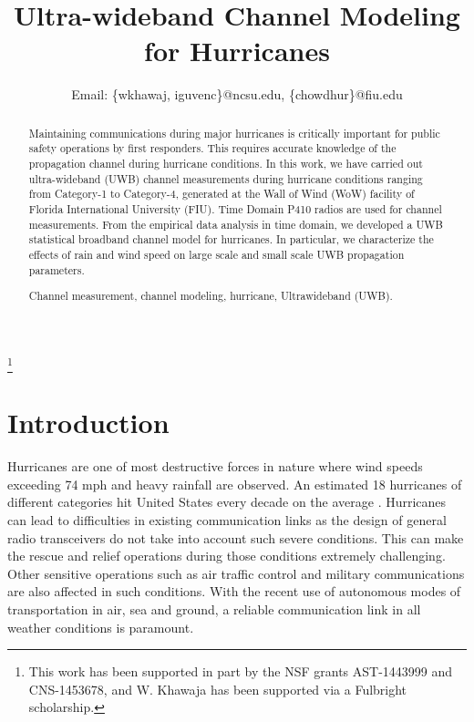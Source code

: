 \documentclass[conference]{IEEEtran}
\newcommand\blfootnote[1]{%
		\begingroup
		\renewcommand\thefootnote{}\footnote{#1}%
		\addtocounter{footnote}{-1}%
		\endgroup
	}
\begin{document}
	

\title{Ultra-wideband Channel Modeling for Hurricanes}

\author{
Email: \{wkhawaj, iguvenc\}@ncsu.edu, \{chowdhur\}@fiu.edu
	
}


\maketitle
\blfootnote{This work has been supported in part by the NSF grants AST-1443999 and CNS-1453678, and W. Khawaja has been supported via a Fulbright scholarship.}
\begin{abstract}
Maintaining communications during major hurricanes is critically important for public safety operations by first responders. This requires accurate knowledge of the propagation channel during hurricane conditions. In this work, we have carried out ultra-wideband (UWB) channel measurements during hurricane conditions ranging from Category-1 to Category-4, generated at the Wall of Wind (WoW) facility of Florida International University (FIU). Time Domain P410 radios are used for channel measurements. From the empirical data analysis in time domain, we developed a UWB statistical broadband channel model for hurricanes. In particular, we characterize the effects of rain and wind speed on large scale and small scale UWB propagation parameters. %

\begin{IEEEkeywords}
Channel measurement, channel modeling, hurricane, Ultrawideband (UWB).
\end{IEEEkeywords}

\end{abstract}

\IEEEpeerreviewmaketitle

\section{Introduction}

Hurricanes are one of most destructive forces in nature where wind speeds exceeding 74 mph and heavy rainfall are observed. An estimated 18 hurricanes of different categories hit United States every decade on the average \cite{NOAA}. Hurricanes can lead to difficulties in existing communication links as the design of general radio transceivers do not take into account such severe conditions. This can make the rescue and relief operations during those conditions extremely challenging. Other sensitive operations such as air traffic control and military communications are also affected in such conditions. With the recent use of autonomous modes of transportation in air, sea and ground, a reliable communication link in all weather conditions is paramount.
\end{document}
